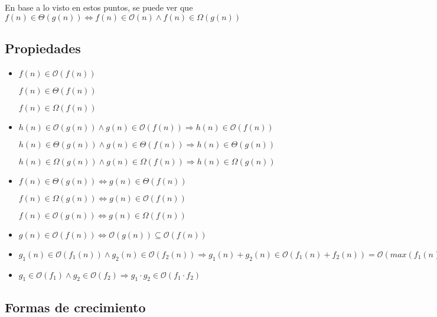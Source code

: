 En base a lo visto en estos puntos, se puede ver que $f(n) \in \Theta(g(n))
\iff f(n) \in \mathcal{O}(n) \land f(n) \in \Omega(g(n))$

\subsection{Propiedades}

\begin{itemize}
    \item $f(n) \in \mathcal{O}(f(n))$

        $f(n) \in \Theta(f(n))$

        $f(n) \in \Omega(f(n))$ 

    \item $h(n) \in \mathcal{O}(g(n)) \land g(n) \in \mathcal{O}(f(n))
        \Rightarrow h(n) \in \mathcal{O}(f(n))$
        
        $h(n) \in \Theta(g(n)) \land g(n) \in \Theta(f(n)) \Rightarrow h(n) \in
        \Theta(g(n))$

        $h(n) \in \Omega(g(n)) \land g(n) \in \Omega(f(n)) \Rightarrow h(n) \in
        \Omega(g(n))$

    \item $f(n) \in \Theta(g(n)) \iff g(n) \in \Theta(f(n))$

        $f(n) \in \Omega(g(n)) \iff g(n) \in \mathcal{O}(f(n))$

        $f(n) \in \mathcal{O}(g(n)) \iff g(n) \in \Omega(f(n))$

    \item $g(n) \in \mathcal{O}(f(n)) \iff \mathcal{O}(g(n)) \subseteq
        \mathcal{O}(f(n))$
        
    \item $g_1(n) \in \mathcal{O}(f_1(n)) \land g_2(n) \in \mathcal{O}(f_2(n))
        \Rightarrow g_1(n) + g_2(n) \in \mathcal{O}(f_1(n) + f_2(n)) =
        \mathcal{O}(max(f_1(n), f_2(n)))$

    \item $g_1 \in \mathcal{O}(f_1) \land g_2 \in \mathcal{O}(f_2) \Rightarrow
        g_1 \cdot g_2 \in \mathcal{O}(f_1 \cdot f_2)$

\end{itemize}


\subsection{Formas de crecimiento}

